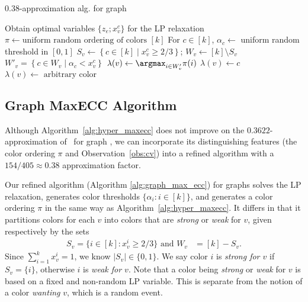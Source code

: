 \begin{algorithm}[t]
	\caption{$0.38$-approximation alg. for graph \maxecc{}}
	\label{alg:graph_max_ecc}
	\begin{algorithmic}
		\STATE Obtain optimal variables $\{z_e; x_v^c\}$ for the LP relaxation
		\STATE $\pi \leftarrow \text{uniform random ordering of colors } [k]$
		\STATE For $c \in [k]$, $\alpha_c \leftarrow $ uniform random threshold in $[0,1]$
		\STATE $S_v \leftarrow \left\{c \in [k] \mid x_v^c \geq 2/3 \right\}$; $W_v \leftarrow [k] \setminus S_v$
		\STATE $W'_v = \left\{ c \in W_v \mid \alpha_c < x_v^c \right\}$
		\STATE $\lambda(v) \leftarrow \argmax_{i \in W'_v} \pi(i)$
		\STATE $\lambda(v) \leftarrow c$
		\ELSE
		\STATE $\lambda(v) \leftarrow \text{ arbitrary color}$
		\ENDIF
		\ENDFOR
	\end{algorithmic}
\end{algorithm}


\subsection{Graph MaxECC Algorithm}
Although Algorithm~\ref{alg:hyper_maxecc} does not improve on the $0.3622$-approximation of~\citet{ageev20200} for graph \maxecc{}, we can incorporate its distinguishing features (the color ordering $\pi$ and Observation~\ref{obs:cv}) into a refined algorithm with a $154/405 \approx 0.38$ approximation factor.

Our refined algorithm (Algorithm \ref{alg:graph_max_ecc}) for graphs solves the LP relaxation, generates color thresholds $\{\alpha_i \colon i \in [k]\}$, and generates a color ordering $\pi$ in the same way as Algorithm~\ref{alg:hyper_maxecc}. It differs in that it partitions colors for each $v$ into colors that are \emph{strong} or \emph{weak} for $v$, given respectively by the sets
\begin{align*}
	S_v = \{ i \in [k] \colon x_v^i \geq 2/3\} \text{ and } W_v & = [k] - S_v.
\end{align*}
Since $\sum_{i = 1}^k x_v^i = 1$, we know $|S_v| \in \{0,1\}$. We say color $i$ is \textit{strong for $v$} if $S_v = \{i\}$, otherwise $i$ is \textit{weak for $v$}. Note that a color being \emph{strong} or \emph{weak} for $v$ is based on a fixed and non-random LP variable. This is separate from the notion of a color \emph{wanting} $v$, which is a random event.

